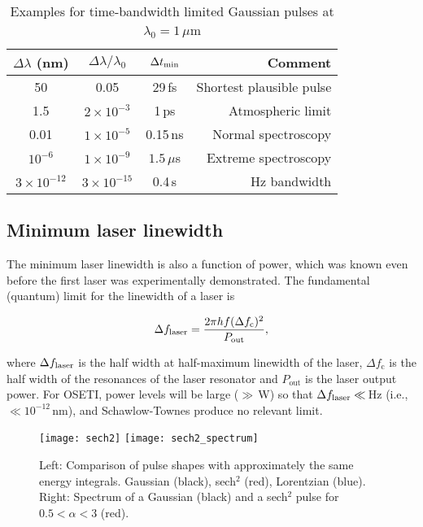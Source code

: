 \documentclass[twocolumn,tighten,longauthor]{myaastex62}
\begin{document}
\begin{table}
\center
\caption{Examples for time-bandwidth limited Gaussian pulses at $\lambda_0=1\,\mu$m}
\label{tab:time-bandwidth}
\begin{tabular}{cccr}
\hline
$\Delta \lambda$ (nm) & $\Delta \lambda / \lambda_0$ & $\Delta t_{\rm min}$ & Comment \\
\hline
50   & 0.05              & 29\,fs   & Shortest plausible pulse \\
1.5  & $2\times10^{-3}$ & 1\,ps   & Atmospheric limit \\
0.01 & $1\times10^{-5}$ & 0.15\,ns  & Normal spectroscopy \\
$10^{-6}$ & $1\times10^{-9}$ & $1.5\,\mu$s & Extreme spectroscopy\\
$3\times10^{-12}$ & $3\times10^{-15}$ & 0.4\,s & Hz bandwidth \\
\hline
\end{tabular}
\end{table}


\subsection{Minimum laser linewidth}
\label{sub:schawlow}
The minimum laser linewidth is also a function of power, which was known even before the first laser was experimentally demonstrated. The fundamental (quantum) limit for the linewidth of a laser is \citep{Schawlow1958}

\begin{equation}
\Delta f_{\rm laser} = \frac{2 \pi h f (\Delta f_\mathrm{c})^2}{P_\mathrm{out}},
\end{equation}

where $\Delta f_{\rm laser}$ is the half width at half-maximum linewidth of the laser, $\Delta f_\mathrm{c}$ is the half width of the resonances of the laser resonator and $P_\mathrm{out}$ is the laser output power. For OSETI, power levels will be large ($\gg\,$W) so that $\Delta f_{\rm laser} \ll \,$Hz (i.e., $\ll 10^{-12}\,$nm), and Schawlow-Townes produce no relevant limit.


\begin{figure*}
\texttt{[image: sech2]}
\texttt{[image: sech2\_spectrum]}
\caption{\label{fig:sech2}Left: Comparison of pulse shapes with approximately the same energy integrals. Gaussian (black), sech$^2$ (red), Lorentzian (blue). Right: Spectrum of a Gaussian (black) and a sech$^2$ pulse for $0.5<\alpha<3$ (red).}
\end{figure*}
\end{document}

